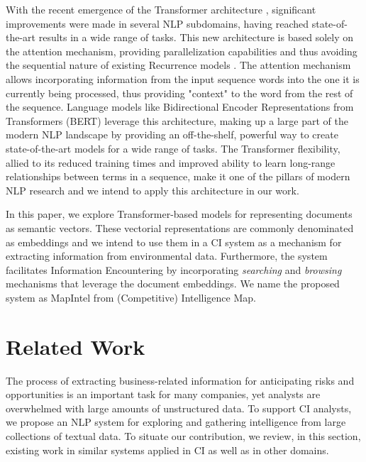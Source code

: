\documentclass[a4paper]{article}
\begin{document}
With the recent emergence of the Transformer architecture \citep{vaswani2017}, significant improvements were made in several NLP subdomains, having reached state-of-the-art results in a wide range of tasks. This new architecture is based solely on the attention mechanism, providing parallelization capabilities and thus avoiding the sequential nature of existing Recurrence models \citep{hochreiter1997, cho2014}. The attention mechanism allows incorporating information from the input sequence words into the one it is currently being processed, thus providing "context" to the word from the rest of the sequence. Language models like Bidirectional Encoder Representations from Transformers (BERT) \citep{devlin2019} leverage this architecture, making up a large part of the modern NLP landscape by providing an off-the-shelf, powerful way to create state-of-the-art models for a wide range of tasks. The Transformer flexibility, allied to its reduced training times and improved ability to learn long-range relationships between terms in a sequence, make it one of the pillars of modern NLP research and we intend to apply this architecture in our work.

In this paper, we explore Transformer-based models for representing documents as semantic vectors. These vectorial representations are commonly denominated as embeddings and we intend to use them in a CI system as a mechanism for extracting information from environmental data. Furthermore, the system facilitates Information Encountering by incorporating \emph{searching} and \emph{browsing} mechanisms that leverage the document embeddings. We name the proposed system as MapIntel from (Competitive) Intelligence Map.

\section{Related Work}
The process of extracting business-related information for anticipating risks and opportunities is an important task for many companies, yet analysts are overwhelmed with large amounts of unstructured data. To support CI analysts, we propose an NLP system for exploring and gathering intelligence from large collections of textual data. To situate our contribution, we review, in this section, existing work in similar systems applied in CI as well as in other domains.
\end{document}
